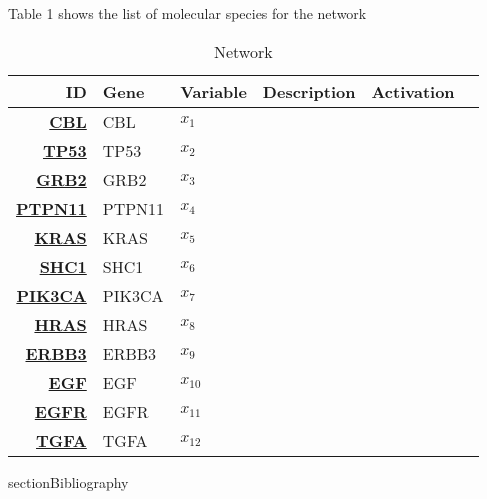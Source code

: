 Table 1 shows the list of molecular species for the network
\vspace{8pt}
\begin{table}[H]
	\begin{tabular}{rlllll}
		\hline
		ID & Gene & Variable & Description & Activation \\ 
		\hline
		\href{https://www.malacards.org/search/results/CBL}{\textbf{CBL}} & CBL & $x_1$ & & \\
		\href{https://www.malacards.org/search/results/TB53}{\textbf{TP53}} & TP53 & $x_2$ & & \\
		\href{https://www.malacards.org/search/results/GRB2}{\textbf{GRB2}} & GRB2 & $x_3$ & & \\
		\href{https://www.malacards.org/search/results/PTPN11}{\textbf{PTPN11}} & PTPN11 & $x_4$ & & \\ 
		\href{https://www.malacards.org/search/results/KRAS}{\textbf{KRAS}} & KRAS & $x_5$ & & \\
		\href{https://www.malacards.org/search/results/SHC1}{\textbf{SHC1}} & SHC1 & $x_6$ & & \\
		\href{https://www.malacards.org/search/results/PIK3CA}{\textbf{PIK3CA}} & PIK3CA & $x_7$ & & \\ 
		\href{https://www.malacards.org/search/results/HRAS}{\textbf{HRAS}} & HRAS & $x_8$ & & \\
		\href{https://www.malacards.org/search/results/ERBB3}{\textbf{ERBB3}} & ERBB3 & $x_9$ & & \\
		\href{https://www.malacards.org/search/results/EGF}{\textbf{EGF}} & EGF & $x_{10}$ & & \\
		\href{https://www.malacards.org/search/results/EGFR}{\textbf{EGFR}} & EGFR & $x_{11}$ & & \\
		\href{https://www.malacards.org/search/results/TGFA}{\textbf{TGFA}} & TGFA & $x_{12}$ & & \\
		\hline
	\end{tabular}
	\caption{Network}
	\label{tab:Table2}
\end{table}

section{Bibliography}

